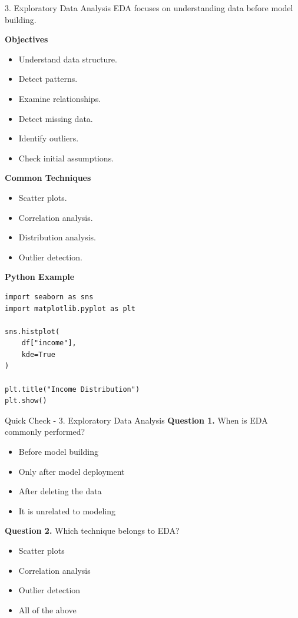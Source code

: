 \documentclass[aspectratio=169,11pt]{beamer}
\begin{document}
\begin{frame}{3. Exploratory Data Analysis}
\small
EDA focuses on understanding data before model building.\par\medskip
\textbf{Objectives}\par\medskip
\begin{itemize}
\item Understand data structure.
\item Detect patterns.
\item Examine relationships.
\item Detect missing data.
\item Identify outliers.
\item Check initial assumptions.
\end{itemize}
\textbf{Common Techniques}\par\medskip
\begin{itemize}
\item Scatter plots.
\item Correlation analysis.
\item Distribution analysis.
\item Outlier detection.
\end{itemize}
\textbf{Python Example}\par\medskip
\begin{lstlisting}[style=py]
import seaborn as sns
import matplotlib.pyplot as plt

sns.histplot(
    df["income"],
    kde=True
)

plt.title("Income Distribution")
plt.show()
\end{lstlisting}
\end{frame}
\begin{frame}[allowframebreaks]{Quick Check - 3. Exploratory Data Analysis}
\footnotesize
\textbf{Question 1.} When is EDA commonly performed?\par\medskip
\begin{itemize}
\item[\textbf{A.}] Before model building
\item[\textbf{B.}] Only after model deployment
\item[\textbf{C.}] After deleting the data
\item[\textbf{D.}] It is unrelated to modeling
\end{itemize}
\textbf{Question 2.} Which technique belongs to EDA?\par\medskip
\begin{itemize}
\item[\textbf{A.}] Scatter plots
\item[\textbf{B.}] Correlation analysis
\item[\textbf{C.}] Outlier detection
\item[\textbf{D.}] All of the above
\end{itemize}
\end{frame}
\end{document}

